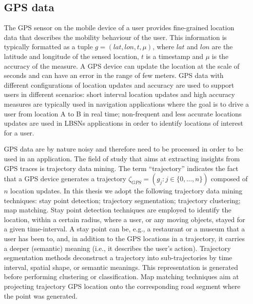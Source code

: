 \subsection{GPS data}
The GPS sensor on the mobile device of a user provides fine-grained location data that describes the mobility behaviour of the user. This information is typically formatted as a tuple $g=(lat,lon,t,\mu)$, where $lat$ and $lon$ are the latitude and longitude of the sensed location, $t$ is a timestamp and $\mu$ is the accuracy of the measure. A GPS device can update the location at the scale of seconds and can have an error in the range of few meters. 
GPS data with different configurations of location updates and accuracy are used to support users in different scenarios: short interval location updates and high accuracy measures are typically used in navigation applications where the goal is to drive a user from location A to B in real time; non-frequent and less accurate locations updates are used in LBSNs 
applications in order to identify locations of interest for a user.

GPS data are by nature  noisy and therefore need to be processed in order to be used in an application.
The field of study that aims at extracting insights from GPS traces is trajectory data mining. 
The term ``trajectory'' indicates the fact that a GPS device generates a trajectory %
$\zeta_{GPS} = (g_j: j \in \{ 0, \dots, n\})$ 
composed of $n$ location updates. In this thesis we adopt the following trajectory data mining techniques: stay point detection; trajectory segmentation; trajectory clustering; map matching. Stay point detection techniques are employed to identify the location, 
within a certain radius, where a user, or any moving objects, stayed for a given time-interval. A stay point can be, e.g., a restaurant or a museum that a user has been to, and, in addition to the GPS locations in a trajectory, it carries a deeper (semantic) meaning (i.e., it describes the user's action).
Trajectory segmentation methods deconstruct a trajectory into sub-trajectories by time interval, spatial shape, or semantic meanings. This representation is generated before performing clustering or classification. Map matching techniques aim at projecting trajectory GPS location onto the corresponding road segment where the point was generated.

